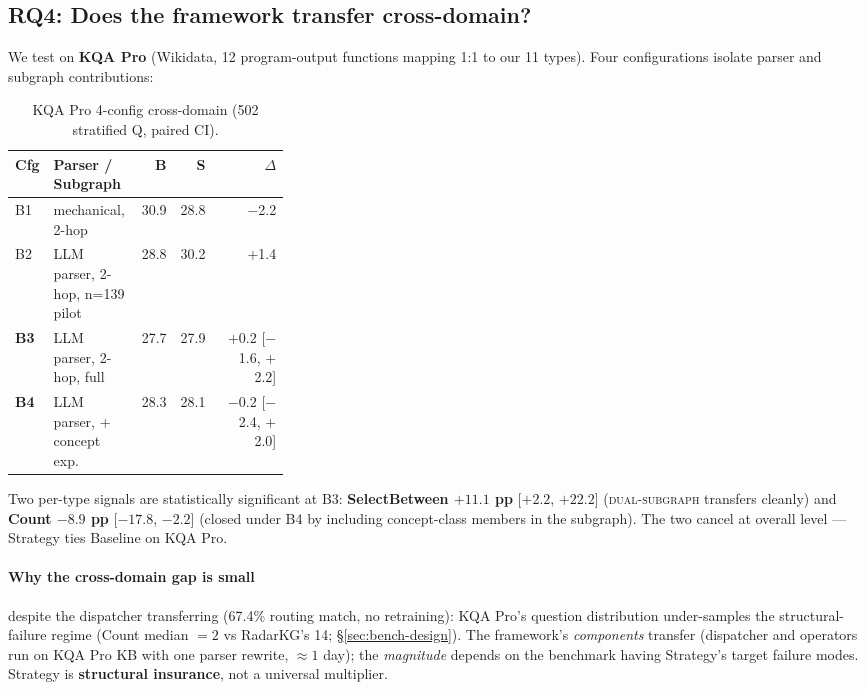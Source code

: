 \documentclass[review]{elsarticle}
\newcommand{\op}[1]{\textsc{\small #1}}
\begin{document}
\subsection{RQ4: Does the framework transfer cross-domain?}
\label{sec:rq4}

We test on \textbf{KQA Pro} \citep{cao2022kqapro} (Wikidata, 12 program-output functions mapping 1:1 to our 11 types). Four configurations isolate parser and subgraph contributions:

\begin{table}[h]
\centering
\small
\caption{KQA Pro 4-config cross-domain (502 stratified Q, paired CI).}
\label{tab:kqapro}
\begin{tabular}{l p{0.32\linewidth} r r r}
\toprule
\textbf{Cfg} & \textbf{Parser / Subgraph} & \textbf{B} & \textbf{S} & \textbf{$\Delta$} \\
\midrule
B1 & mechanical, 2-hop  & 30.9 & 28.8 & $-$2.2 \\
B2 & LLM parser, 2-hop, n=139 pilot & 28.8 & 30.2 & $+$1.4 \\
\textbf{B3} & LLM parser, 2-hop, full  & 27.7 & 27.9 & $\mathbf{+0.2}$ [$-$1.6, $+$2.2] \\
\textbf{B4} & LLM parser, $+$concept exp.  & 28.3 & 28.1 & $\mathbf{-0.2}$ [$-$2.4, $+$2.0] \\
\bottomrule
\end{tabular}
\end{table}

Two per-type signals are statistically significant at B3: \textbf{SelectBetween $+11.1$ pp} [$+2.2$, $+22.2$] (\op{dual-subgraph} transfers cleanly) and \textbf{Count $-8.9$ pp} [$-17.8$, $-2.2$] (closed under B4 by including concept-class members in the subgraph). The two cancel at overall level --- Strategy ties Baseline on KQA Pro.

\paragraph{Why the cross-domain gap is small} despite the dispatcher transferring (67.4\% routing match, no retraining): KQA Pro's question distribution under-samples the structural-failure regime (Count median $=2$ vs RadarKG's 14; §\ref{sec:bench-design}). The framework's \emph{components} transfer (dispatcher and operators run on KQA Pro KB with one parser rewrite, ${\approx}1$ day); the \emph{magnitude} depends on the benchmark having Strategy's target failure modes. Strategy is \textbf{structural insurance}, not a universal multiplier.
\end{document}
